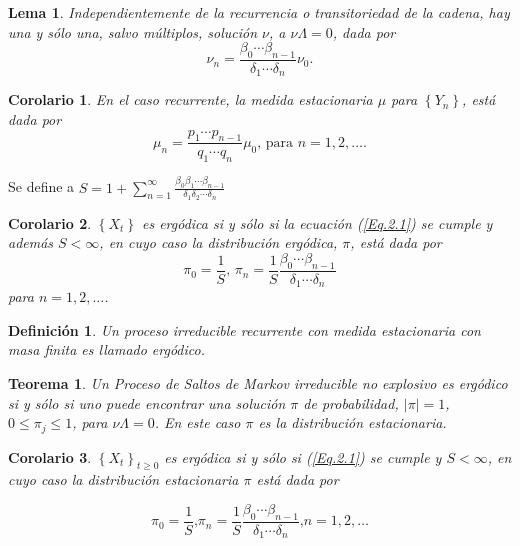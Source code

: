 \documentclass{article}
\newtheorem{Def}{Definición}[section]
\newtheorem{Teo}{Teorema}[section]
\newtheorem{Cor}{Corolario}[section]
\newtheorem{Lema}{Lema}[section]
\numberwithin{equation}{section}
\begin{document}
\begin{Lema}\label{Lema.2.2}
Independientemente de la recurrencia o transitoriedad de la cadena, hay una y s\'olo una, salvo m\'ultiplos, soluci\'on $\nu$, a $\nu\Lambda=0$, dada por
\begin{equation}\label{Eq.2.2}
\nu_{n}=\frac{\beta_{0}\cdots\beta_{n-1}}{\delta_{1}\cdots\delta_{n}}\nu_{0}.
\end{equation}
\end{Lema}

\begin{Cor}\label{Corolario2.3}
En el caso recurrente, la medida estacionaria $\mu$ para $\left\{Y_{n}\right\}$, est\'a dada por
\begin{equation}\label{Eq.2.3}
\mu_{n}=\frac{p_{1}\cdots p_{n-1}}{q_{1}\cdots q_{n}}\mu_{0}\textrm{, para }n=1,2,\ldots.
\end{equation}
\end{Cor}


Se define a $S=1+\sum_{n=1}^{\infty}\frac{\beta_{0}\beta_{1}\cdots\beta_{n-1}}{\delta_{1}\delta_{2}\cdots\delta_{n}}$

\begin{Cor}\label{Cor.2.4}
$\left\{X_{t}\right\}$ es erg\'odica si y s\'olo si la ecuaci\'on (\ref{Eq.2.1}) se cumple y adem\'as $S<\infty$, en cuyo caso la distribuci\'on erg\'odica, $\pi$, est\'a dada por
\begin{equation}\label{Eq.2.4}
\pi_{0}=\frac{1}{S}\textrm{, }\pi_{n}=\frac{1}{S}\frac{\beta_{0}\cdots\beta_{n-1}}{\delta_{1}\cdots\delta_{n}}
\end{equation}
para $n=1,2,\ldots$.
\end{Cor}

\begin{Def}
Un proceso irreducible recurrente con medida estacionaria con masa finita es llamado erg\'odico.
\end{Def}

\begin{Teo}\label{Teo4.3}
Un Proceso de Saltos de Markov irreducible no explosivo es erg\'odico si y s\'olo si uno puede encontrar una soluci\'on $\pi$ de probabilidad, $|\pi|=1$, $0\leq\pi_{j}\leq1$, para $\nu\Lambda=0$. En este caso $\pi$ es la distribuci\'on estacionaria.
\end{Teo}
\begin{Cor}\label{Corolario2.4}
$\left\{X_{t}\right\}_{t\geq0}$ es erg\'odica si y s\'olo si (\ref{Eq.2.1}) se cumple y $S<\infty$, en cuyo caso la distribuci\'on estacionaria $\pi$ est\'a dada por

\begin{equation}\label{Eq.2.4}
\pi_{0}=\frac{1}{S}\textrm{,
}\pi_{n}=\frac{1}{S}\frac{\beta_{0}\cdots\beta_{n-1}}{\delta_{1}\cdots\delta_{n}}\textrm{,
}n=1,2,\ldots
\end{equation}
\end{Cor}
\end{document}
